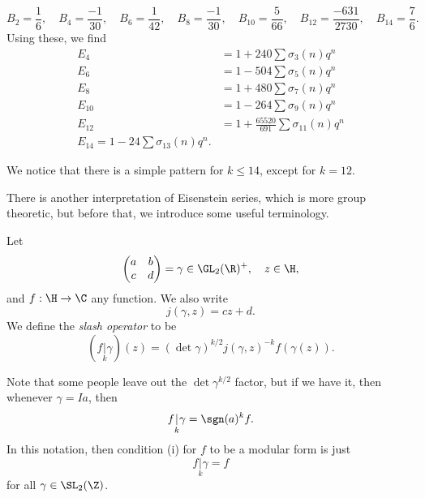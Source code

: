\documentclass[a4paper]{article}
\begin{document}
\begin{eg}
  \[
    B_2 = \frac{1}{6},\quad B_4 = \frac{-1}{30},\quad B_6 = \frac{1}{42},\quad B_8 = \frac{-1}{30},\quad B_{10} = \frac{5}{66}, \quad B_{12} = \frac{-631}{2730},\quad B_{14} = \frac{7}{6}.
  \]
  Using these, we find
  \begin{align*}
    E_4 &= 1 + 240 \sum \sigma_3(n) q^n\\
    E_6 &= 1 - 504 \sum \sigma_5 (n) q^n\\
    E_8 &= 1 + 480 \sum \sigma_7(n) q^n\\
    E_{10} &= 1 - 264 \sum \sigma_9(n) q^n\\
    E_{12} &= 1 + \frac{65520}{691} \sum \sigma_{11}(n) q^n\\
    E_{14} = 1 - 24 \sum \sigma_{13}(n) q^n.
  \end{align*}
\end{eg}
We notice that there is a simple pattern for $k \leq 14$, except for $k = 12$.

There is another interpretation of Eisenstein series, which is more group theoretic, but before that, we introduce some useful terminology.

\begin{defi}
  Let
  \[
    \begin{pmatrix}
      a & b\\
      c & d
    \end{pmatrix} = \gamma \in \GL_2(\R)^+,\quad z \in \H,
  \]
  and $f: \H \to \C$ any function. We also write
  \[
    j(\gamma, z) = cz + d.
  \]
  We define the \emph{slash operator} to be
  \[
    (f\underset{k}{|} \gamma) (z) = (\det \gamma)^{k/2} j(\gamma, z)^{-k} f(\gamma(z)).
  \]
\end{defi}
Note that some people leave out the $\det \gamma^{k/2}$ factor, but if we have it, then whenever $\gamma = Ia$, then
\[
  f\underset{k}{|} \gamma = \sgn(a)^k f.
\]
In this notation, then condition (i) for $f$ to be a modular form is just
\[
  f\underset{k}{|}\gamma = f
\]
for all $\gamma \in \SL_2(\Z)$.
\end{document}
